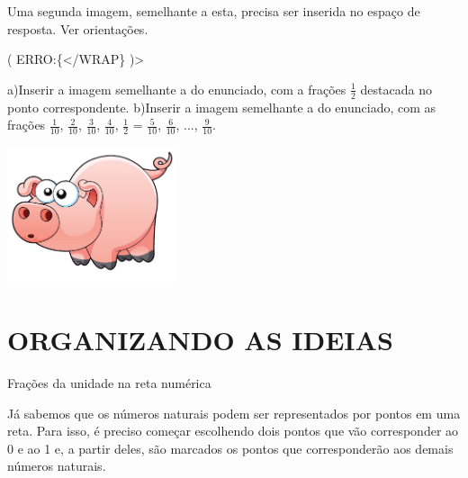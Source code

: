 \documentclass[a4,12pt]{book}
\begin{document}
Uma segunda imagem, semelhante a esta, precisa ser inserida no espaço de resposta. Ver orientações.


( ERRO:\{</WRAP\} )>


a)Inserir a imagem semelhante a do enunciado, com a frações $\frac{1}{2}$ destacada no ponto correspondente.
b)Inserir a imagem semelhante a do enunciado, com as frações $\frac{1}{10}$, $\frac{2}{10}$, $\frac{3}{10}$, $\frac{4}{10}$, $\frac{1}{2}$ = $\frac{5}{10}$, $\frac{6}{10}$, ..., $\frac{9}{10}$.




\includegraphics[width=\textwidth,height=4cm, keepaspectratio]{pig}


\section*{ ORGANIZANDO AS IDEIAS }


Frações da unidade na reta numérica \mbox{} \newline


Já sabemos que os números naturais podem ser representados por pontos em uma reta.
Para isso, é preciso começar escolhendo dois pontos que vão corresponder ao 0 e ao 1 e, a partir deles, são marcados os pontos que corresponderão aos demais números naturais.
\end{document}
